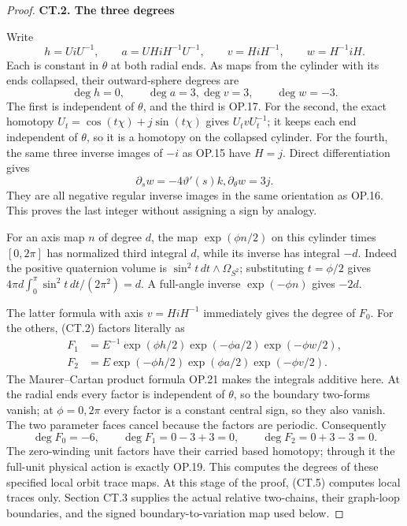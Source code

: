 \begin{proof}
\par

\medskip\noindent\textbf{CT.2. The three degrees}

\par\nobreak

Write
\[
 h=UiU^{-1},\qquad a=UHiH^{-1}U^{-1},\qquad
 v=HiH^{-1},\qquad w=H^{-1}iH.
\]
Each is constant in \(\theta\) at both radial ends. As maps from
the cylinder with its ends collapsed, their outward-sphere degrees
are
\[
             \deg h=0,\qquad \deg a=3,
             \deg v=3,\qquad \deg w=-3.             \tag{CT.3}
\]
The first is independent of \(\theta\), and the third is OP.17.
For the second, the exact homotopy
\(U_t=\cos(t\chi)+j\sin(t\chi)\) gives
\(U_tvU_t^{-1}\); it keeps each end independent of \(\theta\),
so it is a homotopy on the collapsed cylinder. For the fourth, the
same three inverse images of \(-i\) as OP.15 have \(H=j\).
Direct differentiation gives
\[
             \partial_s w=-4\vartheta'(s)k,
             \partial_\theta w=3j.
\]
They are all negative regular inverse images in the same orientation
as OP.16. This proves the last integer without assigning a sign by
analogy.

For an axis map \(n\) of degree \(d\), the map
\(\exp(\phi n/2)\) on this cylinder times \([0,2\pi]\) has
normalized third integral \(d\), while its inverse has integral
\(-d\). Indeed the positive quaternion volume is
\(\sin^2 t\,dt\wedge\Omega_{S^2}\); substituting
\(t=\phi/2\) gives
\(4\pi d\int_0^\pi\sin^2t\,dt/(2\pi^2)=d\).
A full-angle inverse \(\exp(-\phi n)\) gives \(-2d\).

The latter formula with axis \(v=HiH^{-1}\) immediately gives the degree of \(F_0\).
For the others, (CT.2) factors literally as
\[
 \begin{aligned}
 F_1&=E^{-1}\exp(\phi h/2)
                  \exp(-\phi a/2)\exp(-\phi w/2),\\
 F_2&=E\exp(-\phi h/2)
                  \exp(\phi a/2)\exp(-\phi v/2).
 \end{aligned}                                           \tag{CT.4}
\]
The Maurer--Cartan product formula OP.21 makes the integrals additive
here. At the radial ends every factor is independent of \(\theta\),
so the boundary two-forms vanish; at \(\phi=0,2\pi\) every factor
is a constant central sign, so they also vanish. The two parameter
faces cancel because the factors are periodic. Consequently
\[
               \deg F_0=-6,\qquad
               \deg F_1=0-3+3=0,\qquad
               \deg F_2=0+3-3=0.                    \tag{CT.5}
\]
The zero-winding unit factors have their carried based homotopy;
through it the full-unit physical action is exactly OP.19. This
computes the degrees of these specified local orbit trace maps.
At this stage of the proof, (CT.5) computes local traces only.
Section CT.3 supplies the actual relative two-chains, their graph-loop
boundaries, and the signed boundary-to-variation map used below.


\end{proof}

